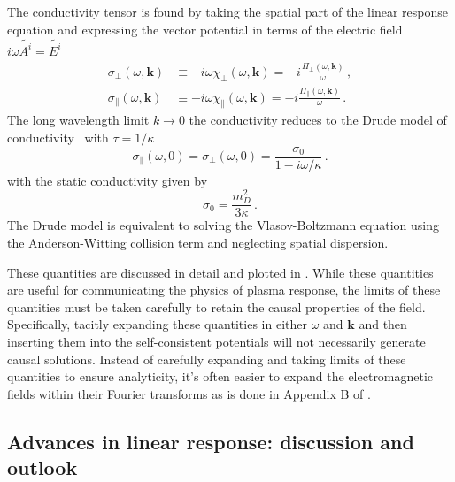 The conductivity tensor is found by taking the spatial part of the linear response equation  and expressing the vector potential in terms of the electric field $i \omega \widetilde{A^i} = \widetilde{E^i}$~\cite{Starke:2014tfa,melrose2008quantum}
\begin{align}\label{eq:sigmaperp}
    \sigma_\perp(\omega,\boldsymbol{k}) &\equiv - i \omega \chi_\perp(\omega,\boldsymbol{k}) =- i \frac{\Pi_\perp(\omega,\boldsymbol{k})}{\omega} \,,\\
    \sigma_\parallel(\omega,\boldsymbol{k}) &\equiv - i \omega \chi_\parallel(\omega,\boldsymbol{k}) =- i \frac{\Pi_\parallel(\omega,\boldsymbol{k})}{\omega} \,.
\end{align} 
The long wavelength limit $k \to 0$ the conductivity reduces to the Drude model of conductivity~\cite{Drude:1900} with $\tau = 1/\kappa$
\begin{equation}\label{eq:drude}
    \sigma_\parallel(\omega,0) = \sigma_\perp(\omega,0) = \frac{\sigma_0}{1-i \omega/\kappa} \,.
\end{equation}
with the static conductivity given by
\begin{equation}\label{eq:condstat}
   \sigma_0 = \frac{m_D^2}{3\kappa}\,.
\end{equation} 
The Drude model is equivalent to solving the Vlasov-Boltzmann equation  using the Anderson-Witting collision term  and neglecting spatial dispersion.

These quantities are discussed in detail and plotted in \cite{Formanek:2021blc}. While these quantities are useful for communicating the physics of plasma response, the limits of these quantities must be taken carefully to retain the causal properties of the field. Specifically, tacitly expanding these quantities in either $\omega$ and $\mathbf{k}$ and then inserting them into the self-consistent potentials  will not necessarily generate causal solutions. Instead of carefully expanding and taking limits of these quantities to ensure analyticity, it's often easier to expand the electromagnetic fields within their Fourier transforms as is done in Appendix B of \cite{Grayson:2022asf}.

\subsection{Advances in linear response: discussion and outlook}


